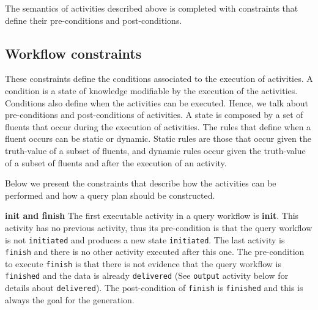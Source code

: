\documentclass{acm_proc_article-sp}
\begin{document}
%


				   
The semantics of activities described above is completed with constraints that define their pre-conditions and post-conditions.
				
\subsection{Workflow constraints} These constraints define the conditions associated to the execution of activities. A condition is a state of knowledge modifiable by the execution of the activities. Conditions also define when the activities can be executed. Hence, we talk about pre-conditions and post-conditions of activities. A state is composed by a set of fluents that occur during the execution of activities. The rules that define when a fluent occurs can be static or dynamic. Static rules are those that occur given the truth-value of a subset of fluents, and dynamic rules occur given the truth-value of a subset of fluents and after the execution of an activity.
               
Below we present the constraints that describe how the activities can be performed and how a query plan should be constructed.
               
\textbf{init and finish} The first executable activity in a query workflow is \textbf{init}. This activity has no previous activity, thus its pre-condition is that the query workflow is not \texttt{initiated} and produces a new state \texttt{initiated}. The last activity is \texttt{finish} and there is no other activity executed after this one. The pre-condition to execute \texttt{finish} is that there is not evidence that the query workflow is \texttt{finished} and the data is already \texttt{delivered} (See \texttt{output} activity below for details about \texttt{delivered}). The post-condition of \texttt{finish} is \texttt{finished} and this is always the goal for the generation.
                            
%


                   
\end{document}
